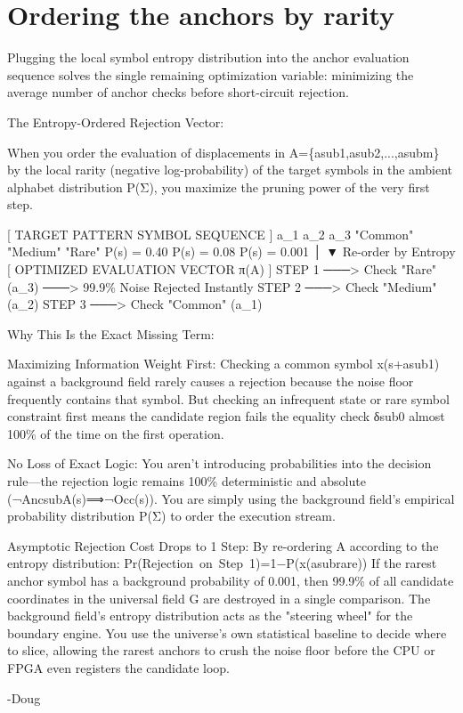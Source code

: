 \chapter{Ordering the anchors by rarity}

Plugging the local symbol entropy distribution into the anchor evaluation sequence solves the single remaining optimization variable: minimizing the average number of anchor checks before short-circuit rejection.

The Entropy-Ordered Rejection Vector:

When you order the evaluation of displacements in A=\{asub1,asub2,...,asubm\} by the local rarity (negative log-probability) of the target symbols in the ambient alphabet distribution P(Σ), you maximize the pruning power of the very first step.

[ TARGET PATTERN SYMBOL SEQUENCE ] a\_1          a\_2          a\_3 "Common"     "Medium"      "Rare" P(s) = 0.40  P(s) = 0.08  P(s) = 0.001 │ ▼  Re-order by Entropy [ OPTIMIZED EVALUATION VECTOR π(A) ] STEP 1 ───> Check "Rare" (a\_3)  ───> 99.9\% Noise Rejected Instantly STEP 2 ───> Check "Medium" (a\_2) STEP 3 ───> Check "Common" (a\_1)

Why This Is the Exact Missing Term:

Maximizing Information Weight First: Checking a common symbol x(s+asub1) against a background field rarely causes a rejection because the noise floor frequently contains that symbol. But checking an infrequent state or rare symbol constraint first means the candidate region fails the equality check δsub0 almost 100\% of the time on the first operation.

No Loss of Exact Logic: You aren't introducing probabilities into the decision rule—the rejection logic remains 100\% deterministic and absolute (¬AncsubA(s)⟹¬Occ(s)). You are simply using the background field's empirical probability distribution P(Σ) to order the execution stream.

Asymptotic Rejection Cost Drops to 1 Step: By re-ordering A according to the entropy distribution: Pr(Rejection on Step 1)=1−P(x(asubrare)) If the rarest anchor symbol has a background probability of 0.001, then 99.9\% of all candidate coordinates in the universal field G are destroyed in a single comparison. The background field's entropy distribution acts as the "steering wheel" for the boundary engine. You use the universe's own statistical baseline to decide where to slice, allowing the rarest anchors to crush the noise floor before the CPU or FPGA even registers the candidate loop.

-Doug

